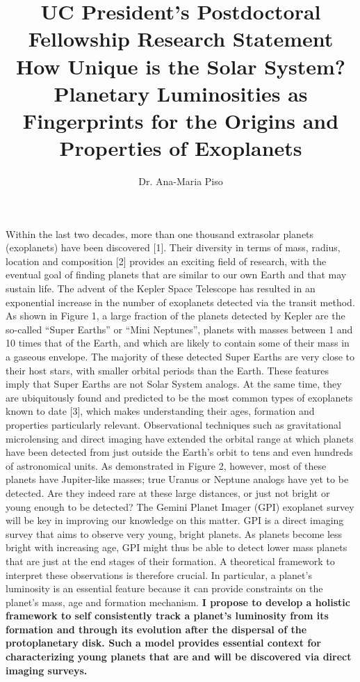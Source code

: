 \documentclass[12pt, letterpaper]{article}
\date{}
\title{\Large UC President's Postdoctoral Fellowship Research Statement \\
\textbf{How Unique is the Solar System? Planetary Luminosities as Fingerprints for the Origins and Properties of Exoplanets}}
\author{Dr. Ana-Maria Piso}
\begin{document}
\maketitle


\vspace{-0.9cm}


Within the last two decades, more than one thousand extrasolar planets (exoplanets) have been discovered [1]. Their diversity in terms of mass, radius, location and composition [2] provides an exciting field of research, with the eventual goal of finding planets that are similar to our own Earth and that may sustain life. The advent of the Kepler Space Telescope has resulted in an exponential increase in the number of exoplanets detected via the transit method. As shown in Figure 1, a large fraction of the planets detected by Kepler are the so-called ``Super Earths'' or ``Mini Neptunes'', planets with masses between 1 and 10 times that of the Earth, and which are likely to contain some of their mass in a gaseous envelope. The majority of these detected Super Earths are very close to their host stars, with smaller orbital periods than the Earth. These features imply that Super Earths are not Solar System analogs. At the same time, they are ubiquitously found and predicted to be the most common types of exoplanets known to date [3], which makes understanding their ages, formation and properties particularly relevant. Observational techniques such as gravitational microlensing and direct imaging have extended the orbital range at which planets have been detected from just outside the Earth's orbit to tens and even hundreds of astronomical units. As demonstrated in Figure 2, however, most of these planets have Jupiter-like masses; true Uranus or Neptune analogs have yet to be detected. Are they indeed rare at these large distances, or just not bright or young enough to be detected? The Gemini Planet Imager (GPI) exoplanet survey will be key in improving our knowledge on this matter. GPI is a direct imaging survey that aims to observe very young, bright planets. As planets become less bright with increasing age, GPI might thus be able to detect lower mass planets that are just at the end stages of their formation. A theoretical framework to interpret these observations is therefore crucial. In particular, a planet's luminosity is an essential feature because it can provide constraints on the planet's mass, age and formation mechanism. \textbf{I propose to develop a holistic framework to self consistently track a planet's luminosity from its formation and through its evolution after the dispersal of the protoplanetary disk. Such a model provides essential context for characterizing young planets that are and will be discovered via direct imaging surveys.}
\end{document}
